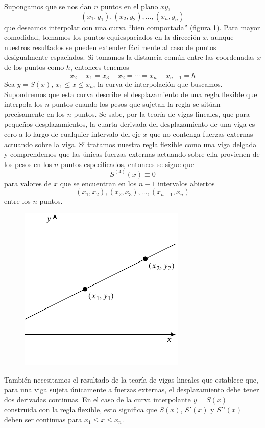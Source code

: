 Supongamos que se nos dan $n$ puntos en el plano $xy$,
$$(x_1, y_1), (x_2, y_2), \dots, (x_n, y_n)$$
que deseamos interpolar con una curva “bien comportada” (figura \ref{fig:bienc}). Para mayor comodidad, tomamos los puntos equiespaciados en la dirección $x$, aunque nuestros resultados se pueden extender fácilmente al caso de puntos desigualmente espaciados. Si tomamos la distancia común entre las coordenadas $x$ de los puntos como $h$, entonces tenemos
$$x_2-x_1=x_3-x_2=\cdots=x_n-x_{n-1}=h$$
Sea $y = S(x)$, $x_1 \leq x \leq x_n$, la curva de interpolación que buscamos. Supondremos que esta curva describe el desplazamiento de una regla flexible que interpola los $n$ puntos cuando los pesos que sujetan la regla se sitúan precisamente en los $n$ puntos. Se sabe, por la teoría de vigas lineales, que para pequeños desplazamientos, la cuarta derivada del desplazamiento de una viga es cero a lo largo de cualquier intervalo del eje $x$ que no contenga fuerzas externas actuando sobre la viga. Si tratamos nuestra regla flexible como una viga delgada y comprendemos que las únicas fuerzas externas actuando sobre ella provienen de los pesos en los $n$ puntos especificados, entonces se sigue que
$$S^{(4)}(x) \equiv 0$$
para valores de $x$ que se encuentran en los $n-1$ intervalos abiertos
$$(x_1, x_2), (x_2, x_3), \dots , (x_{n-1}, x_n)$$
entre los $n$ puntos.
\begin{figure}[h!]
    \centering
    \includegraphics[page=4]{Images/Capitulo8/figurasC8.pdf}
    \caption{}
    \label{fig:bienc}
\end{figure}

También necesitamos el resultado de la teoría de vigas lineales que establece que, para una viga sujeta únicamente a fuerzas externas, el desplazamiento debe tener dos derivadas continuas. En el caso de la curva interpolante $y = S(x)$ construida con la regla flexible, esto significa que $S(x)$, $S′(x)$ y $S′′(x)$ deben ser continuas para $x_1 \leq x \leq x_n$.

